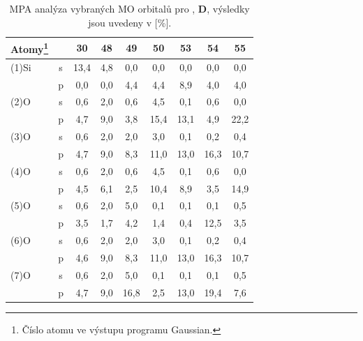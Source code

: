 \documentclass[
digital, %
table,   %
lof,     %
lot,     %
oneside,
]{fithesis3}
\begin{document}
\begin{table}[htbp]
\begin{minipage}{\textwidth}
\begin{center}
\caption{MPA analýza vybraných MO orbitalů pro , \textbf{D}, výsledky jsou uvedeny v [\%].}
\begin{tabular}{|l|c|c|c|c|c|c|c|c|}
\hline
Atomy\footnote{Číslo atomu ve výstupu programu Gaussian.}  \label{si_och3_6_MPA}&  & 30 & 48 & 49 & 50 & 53 & 54 & 55 \\ \hline
(1)Si & s & 13,4  & 4,8  & 0,0  & 0,0  & 0,0  & 0,0  & 0,0  \\ \hline
& p & 0,0  & 0,0  & 4,4  & 4,4  & 8,9  & 4,0  & 4,0  \\ \hline
(2)O & s & 0,6  & 2,0  & 0,6  & 4,5  & 0,1  & 0,6  & 0,0  \\ \hline
& p & 4,7  & 9,0  & 3,8  & 15,4  & 13,1  & 4,9  & 22,2  \\ \hline
(3)O & s & 0,6  & 2,0  & 2,0  & 3,0  & 0,1  & 0,2  & 0,4  \\ \hline
& p & 4,7  & 9,0  & 8,3  & 11,0  & 13,0  & 16,3  & 10,7  \\ \hline
(4)O & s & 0,6  & 2,0  & 0,6  & 4,5  & 0,1  & 0,6  & 0,0  \\ \hline
& p & 4,5  & 6,1  & 2,5  & 10,4  & 8,9  & 3,5  & 14,9  \\ \hline
(5)O & s & 0,6  & 2,0  & 5,0  & 0,1  & 0,1  & 0,1  & 0,5  \\ \hline
& p & 3,5  & 1,7  & 4,2  & 1,4  & 0,4  & 12,5  & 3,5  \\ \hline
(6)O & s & 0,6  & 2,0  & 2,0  & 3,0  & 0,1  & 0,2  & 0,4  \\ \hline
& p & 4,6  & 9,0  & 8,3  & 11,0  & 13,0  & 16,3  & 10,7  \\ \hline
(7)O & s & 0,6  & 2,0  & 5,0  & 0,1  & 0,1  & 0,1  & 0,5  \\ \hline
& p & 4,7  & 9,0  & 16,8  & 2,5  & 13,0  & 19,4  & 7,6  \\ \hline
\end{tabular}\end{center}\end{minipage}\end{table}
\end{document}
